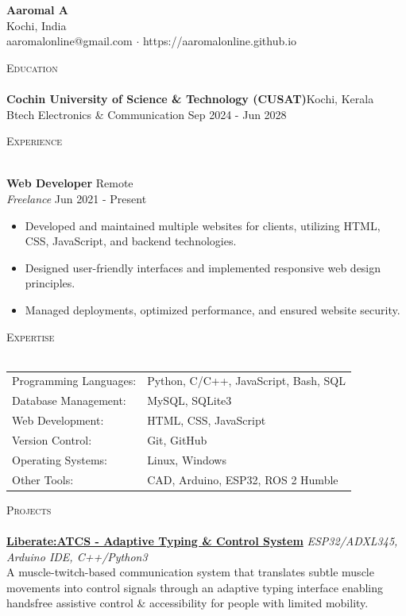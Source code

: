 \documentclass[a4paper]{article}
\newcommand{\lineunder} {
    \vspace*{-8pt} \\
    \hspace*{-18pt} \hrulefill \\
}
\newcommand{\header} [1] {
    {\hspace*{-18pt}\vspace*{6pt} \textsc{#1}}
    \vspace*{-6pt} \lineunder
}
\newcommand{\contact} [3] {
    \vspace*{20pt} %
    \begin{center}
        {\Huge \textbf{#1}}\\
        \vspace{5pt} %
        #2 \\ #3
    \end{center}
    \vspace*{-8pt}
}
\begin{document}
\vspace*{-40pt}

\vspace*{-10pt}
\contact{Aaromal A}{Kochi, India}{aaromalonline@gmail.com $\cdot$ https://aaromalonline.github.io}

\header{Education}
\textbf{Cochin University of Science \& Technology (CUSAT)}\hfill Kochi, Kerala\\
Btech Electronics \& Communication \hfill Sep 2024 - Jun 2028\\
\vspace{2mm}

\header{Experience}
\vspace{1mm}

\textbf{Web Developer} \hfill Remote\\
\textit{Freelance} \hfill Jun 2021 - Present\\
\vspace{-1mm}
\begin{itemize} \itemsep 1pt
    \item Developed and maintained multiple websites for clients, utilizing HTML, CSS, JavaScript, and backend technologies.
    \item Designed user-friendly interfaces and implemented responsive web design principles.
    \item Managed deployments, optimized performance, and ensured website security.
\end{itemize}

\header{Expertise}
\begin{tabular}{ l l }
    Programming Languages: & Python, C/C++, JavaScript, Bash, SQL\\
    Database Management: & MySQL, SQLite3\\
    Web Development: & HTML, CSS, JavaScript\\
    Version Control: & Git, GitHub\\
    Operating Systems: & Linux, Windows\\
    Other Tools: & CAD, Arduino, ESP32, ROS 2 Humble\\
\end{tabular}
\vspace{2mm}

\header{Projects}

\href{https://liberate-atcs.vercel.app/}{\textbf{Liberate:ATCS - Adaptive Typing & Control System}} {\sl ESP32/ADXL345, Arduino IDE, C++/Python3} \\
A muscle-twitch-based communication system that translates subtle muscle movements into control signals through an adaptive typing interface enabling handsfree assistive control & accessibility for people with limited mobility.\\
\vspace*{2mm}
\end{document}
